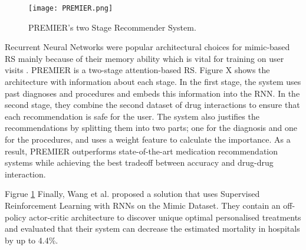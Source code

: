\begin{figure}
    \texttt{[image: PREMIER.png]}
    \caption{PREMIER's two Stage Recommender System.}
    \label{one}
\end{figure}

Recurrent Neural Networks were popular architectural choices for mimic-based RS
mainly because of their memory ability which is vital for training on user
visits \cite{Wang}. PREMIER \cite{Bhoi2021} is a two-stage attention-based
RS. Figure X shows the architecture with information about each stage. In
the first stage, the system uses past diagnoses and procedures and embeds
this information into the RNN. In the second stage, they combine the
second dataset of drug interactions to ensure that each recommendation is
safe for the user. The system also justifies the recommendations by
splitting them into two parts; one for the diagnosis and one for the
procedures, and uses a weight feature to calculate the importance. As a
result, PREMIER outperforms state-of-the-art medication recommendation
systems while achieving the best tradeoff between accuracy and drug-drug
interaction.  

Figrue \ref{one} Finally, Wang et al. \cite{Wang} proposed a solution that uses Supervised Reinforcement
Learning with RNNs on the Mimic Dataset. They contain an off-policy
actor-critic architecture to discover unique optimal personalised
treatments and evaluated that their system can decrease the estimated
mortality in hospitals by up to 4.4\%.

